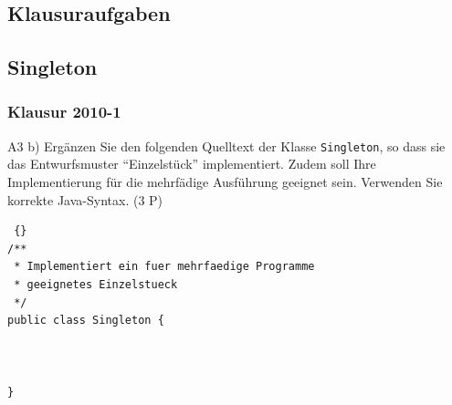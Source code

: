 

\subsection{Klausuraufgaben}
\subsection{Singleton}
\begin{frame}[fragile]
\frametitle {Klausur 2010-1} 
	\begin{block} {A3 b)}
	Ergänzen Sie den folgenden Quelltext der Klasse \texttt{Singleton}, so dass sie das Entwurfsmuster ``Einzelstück'' implementiert. Zudem soll Ihre Implementierung für die mehrfädige Ausführung geeignet sein. Verwenden Sie korrekte Java-Syntax. (3 P)
	\end{block}
	
	\begin{lstlisting} {}
/**
 * Implementiert ein fuer mehrfaedige Programme 
 * geeignetes Einzelstueck
 */
public class Singleton {



}
	\end{lstlisting}
\end{frame}

